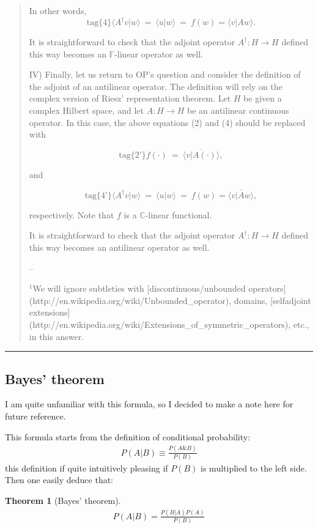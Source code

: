 \documentclass{article}
\numberwithin{equation}{subsection} %
\newtheorem{thm}{Theorem}[section]
\theoremstyle{definition}
\begin{document}
\begin{quote}
        In other words, 
        $$\text{tag\{4\}} \langle A^{\dagger}v | w \rangle~=~\langle u | w \rangle~=~f(w)=\langle v | Aw \rangle. $$

        It is straightforward to check that the adjoint operator $A^{\dagger}:H\to H$ defined this way becomes an $\mathbb{F}$-linear operator as well. 

        IV) Finally, let us return to OP's question and consider the definition of the adjoint of an antilinear operator. The definition will rely on the complex version of Riesz' representation theorem. Let $H$ be given a complex Hilbert space, and let  $A:H\to H$ be an antilinear continuous operator. In this case, the above equations (2) and (4) should be replaced with

        $$\text{tag\{2'\}} f(\cdot)~=~\overline{\langle v | A(\cdot) \rangle},$$

        and

        $$\text{tag\{4'\}} \langle A^{\dagger}v | w \rangle~=~\langle u | w \rangle~=~f(w)=\overline{\langle v | Aw \rangle}, $$

        respectively. Note that $f$ is a $\mathbb{C}$-linear functional.

        It is straightforward to check that the adjoint operator $A^{\dagger}:H\to H$ defined this way becomes an antilinear operator as well.  

        --

        $^{1}$We will ignore subtleties with [discontinuous/unbounded operators](http://en.wikipedia.org/wiki/Unbounded\_operator), domains, [selfadjoint extensions](http://en.wikipedia.org/wiki/Extensions\_of\_symmetric\_operators), etc., in this answer.
    \end{quote}
    
    \begin{center}\noindent\rule{8cm}{0.4pt}\end{center}

    \subsection{Bayes' theorem}
    \label{sec:Bayes-theorem}
    I am quite unfamiliar with this formula, so I decided to make a note
    here for future reference.

    This formula starts from the definition of conditional probability:
    \begin{align}
        P(A|B)\equiv \frac{P(A\&B)}{P(B)}
    \end{align}
    this definition if quite intuitively pleasing if $P(B)$ is multiplied
    to the left side. Then one easily deduce that:
    \begin{thm}[Bayes' theorem] \begin{align}
        P(A|B)=\frac{P(B|A)P(A)}{P(B)}
    \end{align} \end{thm}
\end{document}
